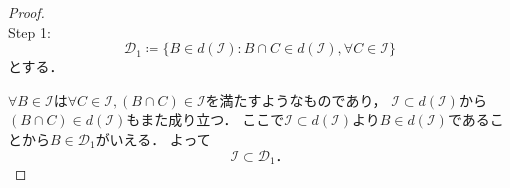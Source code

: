 \documentclass{jsarticle}
\begin{document}
\begin{proof} \mbox{}\\
Step 1:
    \begin{equation}
        \mathcal{D}_1\coloneqq \{B\in d(\mathcal{I}):B\cap C\in d(\mathcal{I}),\forall C\in\mathcal{I}\} \nonumber    
    \end{equation}
    とする．
    
    $\forall B \in \mathcal{I}$は$\forall C \in \mathcal{I},(B\cap C)\in \mathcal{I}$を満たすようなものであり，
    $\mathcal{I} \subset d(\mathcal{I})$から$(B\cap C)\in d(\mathcal{I})$もまた成り立つ．
    ここで$\mathcal{I} \subset d(\mathcal{I})$より$B \in d(\mathcal{I})$であることから$B\in\mathcal{D}_1$がいえる．
    よって
    \begin{equation}
        \mathcal{I}\subset\mathcal{D}_1． \nonumber
    \end{equation}
    

\end{proof}
\end{document}

